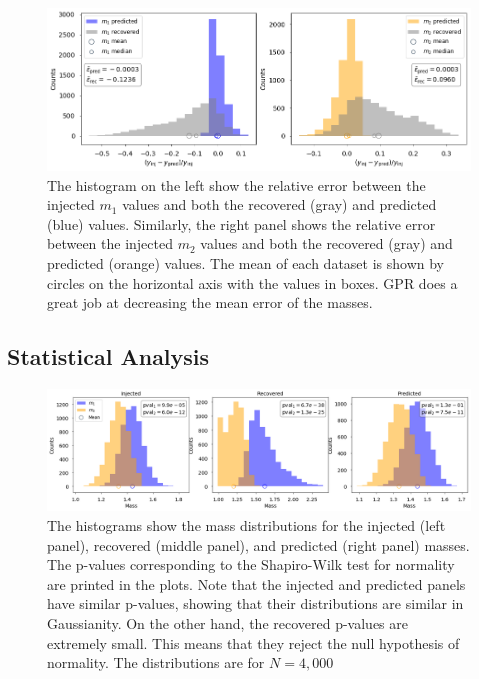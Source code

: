 \documentclass[aps,prd,twocolumn,superscriptaddress,preprintnumbers,floatfix,nofootinbib]{revtex4-2}
\begin{document}
\begin{figure}[!h]
  \centering
  \includegraphics[width=\linewidth]{m1_m2_error_analysis_wboxes}
  \caption{The histogram on the left show the relative error between the injected $m_1$ values and 
  		both the recovered (gray) and predicted (blue) values. Similarly, the right panel shows the 
		relative error between the injected $m_2$ values and both the recovered (gray) and 
		predicted (orange) values. The mean of each dataset is shown by circles on the horizontal 
		axis with the values in boxes. GPR does a great job at decreasing the mean error of the masses. }
  \label{fig:histogram}
\end{figure}

\subsection{Statistical Analysis}
%

\begin{figure}[t]
  \center
  \includegraphics[width=\linewidth]{shapiro_test}
  \caption{The histograms show the mass distributions for the injected (left panel), recovered (middle  
  panel), and predicted (right panel) masses. The p-values corresponding to the Shapiro-Wilk test for 
  normality are printed in the plots. Note that the injected and predicted panels have similar p-values, 
  showing that their distributions are similar in Gaussianity. On the other hand, the recovered p-values 
  are extremely small. This means that they reject the null hypothesis of normality. The distributions 
  are for $N=4,000$ }
  \label{fig:shapiro_test}
\end{figure}
\end{document}
